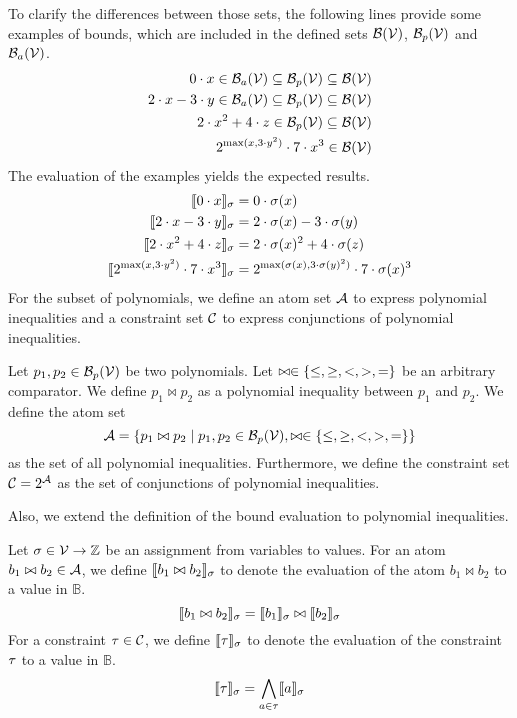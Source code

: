 To clarify the differences between those sets, the following lines provide some examples of bounds, which are included in the defined sets $\mathcal{B}(\mathcal{V})$, $\mathcal{B}_p(\mathcal{V})$ and $\mathcal{B}_a(\mathcal{V})$.
\begin{align*}
  0 \cdot x \in \mathcal{B}_a(\mathcal{V}) \subseteq \mathcal{B}_p(\mathcal{V}) \subseteq \mathcal{B}(\mathcal{V}) \\
  2 \cdot x - 3 \cdot y \in \mathcal{B}_a(\mathcal{V}) \subseteq \mathcal{B}_p(\mathcal{V}) \subseteq \mathcal{B}(\mathcal{V}) \\
  2 \cdot x^2 + 4 \cdot z \in \mathcal{B}_p(\mathcal{V}) \subseteq \mathcal{B}(\mathcal{V}) \\
  2^{\max(x,3 \cdot y^2)} \cdot 7 \cdot x^3 \in \mathcal{B}(\mathcal{V})
\end{align*}
The evaluation of the examples yields the expected results.
\begin{align*}
  \llbracket 0 \cdot x \rrbracket_{\sigma} &= 0 \cdot \sigma(x) \\
  \llbracket 2 \cdot x - 3 \cdot y \rrbracket_{\sigma} &= 2 \cdot \sigma(x) - 3 \cdot \sigma(y) \\
  \llbracket 2 \cdot x^2 + 4 \cdot z \rrbracket_{\sigma} &= 2 \cdot \sigma(x)^2 + 4 \cdot \sigma(z) \\
  \llbracket 2^{\max(x,3 \cdot y^2)} \cdot 7 \cdot x^3 \rrbracket_{\sigma} &= 2^{\max(\sigma(x),3 \cdot \sigma(y)^2)} \cdot 7 \cdot \sigma(x)^3
\end{align*}
For the subset of polynomials, we define an atom set $\mathcal{A}$ to express polynomial inequalities and a constraint set $\mathcal{C}$ to express conjunctions of polynomial inequalities.

\begin{definition}
  Let $p_1, p_2 \in \mathcal{B}_p(\mathcal{V})$ be two polynomials.
  Let $\bowtie \in \lbrace \leq, \geq, <, >, = \rbrace$ be an arbitrary comparator.
  We define $p_1 \bowtie p_2$ as a polynomial inequality between $p_1$ and $p_2$.
  We define the atom set
  \[ \mathcal{A} = \lbrace p_1 \bowtie p_2 \mid p_1, p_2 \in \mathcal{B}_p(\mathcal{V}), \bowtie \in \lbrace \leq, \geq, <, >, = \rbrace \rbrace \]
  as the set of all polynomial inequalities.
  Furthermore, we define the constraint set $\mathcal{C} = 2^{\mathcal{A}}$ as the set of conjunctions of polynomial inequalities.
\end{definition}
Also, we extend the definition of the bound evaluation to polynomial inequalities.

\begin{definition}
  Let $\sigma \in \mathcal{V} \rightarrow \mathbb{Z}$ be an assignment from variables to values.
  For an atom $b_1 \bowtie b_2 \in \mathcal{A}$, we define $\llbracket b_1 \bowtie b_2 \rrbracket_{\sigma}$ to denote the evaluation of the atom $b_1 \bowtie b_2$ to a value in $\mathbb{B}$.
  \[ \llbracket b_1 \bowtie b_2 \rrbracket_{\sigma} = \llbracket b_1 \rrbracket_{\sigma} \bowtie \llbracket b_2 \rrbracket_{\sigma} \]
  For a constraint $\tau \in \mathcal{C}$, we define $\llbracket \tau \rrbracket_{\sigma}$ to denote the evaluation of the constraint $\tau$ to a value in $\mathbb{B}$.
  \[ \llbracket \tau \rrbracket_{\sigma} = \bigwedge_{a \in \tau} \llbracket a \rrbracket_{\sigma} \]
\end{definition}
